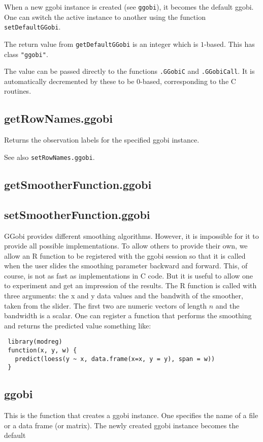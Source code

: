 \documentclass{article}
\def\SFunction#1{{\texttt{\red #1}}}
\begin{document}
When a new ggobi instance is created (see \SFunction{ggobi}), it
becomes the default ggobi.  One can switch the active instance to
another using the function \SFunction{setDefaultGGobi}.

The return value from \SFunction{getDefaultGGobi} is an integer which
is $1$-based.  This has class \texttt{"ggobi"}.

The value can be passed directly to the functions \SFunction{.GGobiC}
and \SFunction{.GGobiCall}.  It is automatically decremented by these
to be $0$-based, corresponding to the C routines.


\subsection{getRowNames.ggobi}
Returns the observation labels for the specified ggobi instance.

See also \SFunction{setRowNames.ggobi}.

\subsection{getSmootherFunction.ggobi}
\subsection{setSmootherFunction.ggobi}
GGobi provides different smoothing algorithms.  However, it is
impossible for it to provide all possible implementations.  To allow
others to provide their own, we allow an R function to be registered
with the ggobi session so that it is called when the user slides the
smoothing parameter backward and forward.  This, of course, is not as
fast as implementations in C code.  But it is useful to allow one to
experiment and get an impression of the results.
The R function is called with three arguments:
the x and y data values and the bandwith of the smoother,
taken from the slider. The first two are numeric vectors of length $n$
and the bandwidth is a scalar.
One can register a function that performs the 
smoothing and returns the predicted value something like:
\begin{verbatim}
 library(modreg)
 function(x, y, w) {
   predict(loess(y ~ x, data.frame(x=x, y = y), span = w))
 }
\end{verbatim}


\subsection{ggobi}
This is the function that creates a ggobi instance.
One specifies the name of a file or a data frame (or matrix).
The newly created ggobi instance becomes the default
\end{document}
